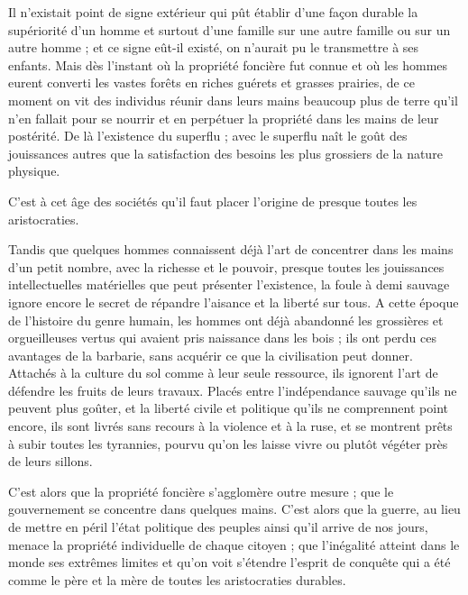 \documentclass[french,twoside]{book} %
\begin{document}
\noindent Il n’existait point de signe extérieur qui pût établir d’une façon durable la supériorité d’un homme et surtout d’une famille sur une autre famille ou sur un autre homme ; et ce signe eût-il existé, on n’aurait pu le transmettre à ses enfants. Mais dès l’instant où la propriété foncière fut connue et où les hommes eurent converti les vastes forêts en riches guérets et grasses prairies, de ce moment on vit des individus réunir dans leurs mains beaucoup plus de terre qu’il n’en fallait pour se nourrir et en perpétuer la propriété dans les mains de leur postérité. De là l’existence du superflu ; avec le superflu naît le goût des jouissances autres que la satisfaction des besoins les plus grossiers de la nature physique.\par
C'est à cet âge des sociétés qu’il faut placer l’origine de presque toutes les aristocraties.\par
Tandis que quelques hommes connaissent déjà l’art de concentrer dans les mains d’un petit nombre, avec la richesse et le pouvoir, presque toutes les jouissances intellectuelles matérielles que peut présenter l’existence, la foule à demi sauvage ignore encore le secret de répandre l’aisance et la liberté sur tous. A cette époque de l’histoire du genre humain, les hommes ont déjà abandonné les grossières et orgueilleuses vertus qui avaient pris naissance dans les bois ; ils ont perdu ces avantages de la barbarie, sans acquérir ce que la civilisation peut donner. Attachés à la culture du sol comme à leur seule ressource, ils ignorent l’art de défendre les fruits de leurs travaux. Placés entre l’indépendance sauvage qu’ils ne peuvent plus goûter, et la liberté civile et politique qu’ils ne comprennent point encore, ils sont livrés sans recours à la violence et à la ruse, et se montrent prêts à subir toutes les tyrannies, pourvu qu’on les laisse vivre ou plutôt végéter près de leurs sillons.\par
C'est alors que la propriété foncière s’agglomère outre mesure ; que le gouvernement se concentre dans quelques mains. C'est alors que la guerre, au lieu de mettre en péril l’état politique des peuples ainsi qu’il arrive de nos jours, menace la propriété individuelle de chaque citoyen ; que l’inégalité atteint dans le monde ses extrêmes limites et qu’on voit s’étendre l’esprit de conquête qui a été comme le père et la mère de toutes les aristocraties durables.\par
\end{document}

